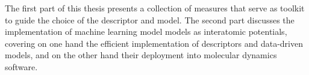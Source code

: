 The first part of this thesis presents a collection of measures that serve as toolkit to guide the choice of the descriptor and model.
The second part discusses the implementation of machine learning model models as interatomic potentials, covering on one hand the efficient implementation of descriptors and data-driven models, and on the other hand their deployment into molecular dynamics software.


